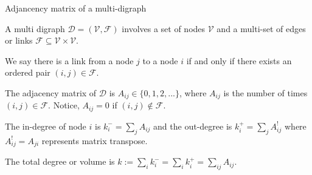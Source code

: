 \documentclass{beamer}
\begin{document}

\begin{frame}{Adjancency matrix of a multi-digraph}

A multi digraph $\mathcal{D}=(\mathcal{V},\mathcal{F})$ involves a set of nodes $\mathcal{V}$ and a multi-set of edges or links $\mathcal{F} \subseteq \mathcal{V}\times \mathcal{V}$.

\vspace{.25cm}

We say there is a link from a node $j$ to a node $i$ if and only if there exists an ordered pair $(i,j) \in \mathcal{F}$.

\vspace{.25cm}

The adjacency matrix of $\mathcal{D}$ is $A_{ij} \in \{0,1,2,...\}$, where $A_{ij}$ is the number of times $(i,j)\in \mathcal{F}$.
Notice, $A_{ij}=0$ if $(i,j)\notin \mathcal{F}$.

\vspace{.25cm}

The in-degree of node $i$ is $k^-_i=\sum_j A_{ij}$ 
and the out-degree is 
$k^+_i= \sum_j A^!_{ij}$ 
where $A^!_{ij}=A_{ji}$ represents matrix transpose.

\vspace{.25cm}

The total degree or volume is $k:=\sum_i k_i^- = \sum_i k_i^+ = \sum_{ij} A_{ij}$.

\end{frame}

\end{document}

